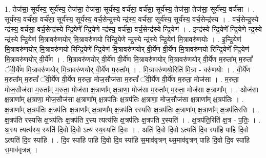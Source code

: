 \documentclass[17pt]{extarticle}
\begin{document}
1. तेज॑सा॒ सूर्य॑स्य॒ सूर्य॑स्य॒ तेज॑सा॒ तेज॑सा॒ सूर्य॑स्य॒ वर्च॑सा॒ वर्च॑सा॒ सूर्य॑स्य॒ तेज॑सा॒ तेज॑सा॒ सूर्य॑स्य॒ वर्च॑सा । . सूर्य॑स्य॒ वर्च॑सा॒ वर्च॑सा॒ सूर्य॑स्य॒ सूर्य॑स्य॒ वर्च॒सेन्द्र॒स्ये न्द्र॑स्य॒ वर्च॑सा॒ सूर्य॑स्य॒ सूर्य॑स्य॒ वर्च॒सेन्द्र॑स्य । . वर्च॒सेन्द्र॒स्ये न्द्र॑स्य॒ वर्च॑सा॒ वर्च॒सेन्द्र॑स्ये न्द्रि॒येणे᳚ न्द्रि॒येणे न्द्र॑स्य॒ वर्च॑सा॒ वर्च॒सेन्द्र॑स्ये न्द्रि॒येण॑ । . इन्द्र॑स्ये न्द्रि॒येणे᳚ न्द्रि॒येणे न्द्र॒स्ये न्द्र॑स्ये न्द्रि॒येण॑ मि॒त्रावरु॑णयोर् मि॒त्रावरु॑णयो रिन्द्रि॒येणे न्द्र॒स्ये न्द्र॑स्ये न्द्रि॒येण॑ मि॒त्रावरु॑णयोः । . इ॒न्द्रि॒येण॑ मि॒त्रावरु॑णयोर् मि॒त्रावरु॑णयो रिन्द्रि॒येणे᳚ न्द्रि॒येण॑ मि॒त्रावरु॑णयोर् वी॒र्ये॑ण वी॒र्ये॑ण मि॒त्रावरु॑णयो रिन्द्रि॒येणे᳚ न्द्रि॒येण॑ मि॒त्रावरु॑णयोर् वी॒र्ये॑ण । . मि॒त्रावरु॑णयोर् वी॒र्ये॑ण वी॒र्ये॑ण मि॒त्रावरु॑णयोर् मि॒त्रावरु॑णयोर् वी॒र्ये॑ण म॒रुता᳚म् म॒रुतां᳚ ॅवी॒र्ये॑ण मि॒त्रावरु॑णयोर् मि॒त्रावरु॑णयोर् वी॒र्ये॑ण म॒रुता᳚म् । . मि॒त्रावरु॑णयो॒रिति॑ मि॒त्रा - वरु॑णयोः । . वी॒र्ये॑ण म॒रुता᳚म् म॒रुतां᳚ ॅवी॒र्ये॑ण वी॒र्ये॑ण म॒रुता॒ मोज॒सौज॑सा म॒रुतां᳚ ॅवी॒र्ये॑ण वी॒र्ये॑ण म॒रुता॒ मोज॑सा । . म॒रुता॒ मोज॒सौज॑सा म॒रुता᳚म् म॒रुता॒ मोज॑सा क्ष॒त्राणा᳚म् क्ष॒त्राणा॒ मोज॑सा म॒रुता᳚म् म॒रुता॒ मोज॑सा क्ष॒त्राणा᳚म् । . ओज॑सा क्ष॒त्राणा᳚म् क्ष॒त्राणा॒ मोज॒सौज॑सा क्ष॒त्राणा᳚म् क्ष॒त्रप॑तिः क्ष॒त्रप॑तिः क्ष॒त्राणा॒ मोज॒सौज॑सा क्ष॒त्राणा᳚म् क्ष॒त्रप॑तिः । . क्ष॒त्राणा᳚म् क्ष॒त्रप॑तिः क्ष॒त्रप॑तिः क्ष॒त्राणा᳚म् क्ष॒त्राणा᳚म् क्ष॒त्रप॑ति रस्यसि क्ष॒त्रप॑तिः क्ष॒त्राणा᳚म् क्ष॒त्राणा᳚म् क्ष॒त्रप॑तिरसि । . क्ष॒त्रप॑ति रस्यसि क्ष॒त्रप॑तिः क्ष॒त्रप॑ति र॒स्य त्यत्य॑सि क्ष॒त्रप॑तिः क्ष॒त्रप॑ति र॒स्यति॑ । . क्ष॒त्रप॑ति॒रिति॑ क्ष॒त्र - प॒तिः॒ । . अ॒स्य त्यत्य॑स्य॒ स्यति॑ दि॒वो दि॒वो ऽत्य॑ स्य॒स्यति॑ दि॒वः । . अति॑ दि॒वो दि॒वो ऽत्यति॑ दि॒व स्पा॑हि पाहि दि॒वो ऽत्यति॑ दि॒व स्पा॑हि । . दि॒व स्पा॑हि पाहि दि॒वो दि॒व स्पा॑हि स॒माव॑वृत्रन् थ्स॒माव॑वृत्रन् पाहि दि॒वो दि॒व स्पा॑हि स॒माव॑वृत्रन्न् । \newline
\end{document}
